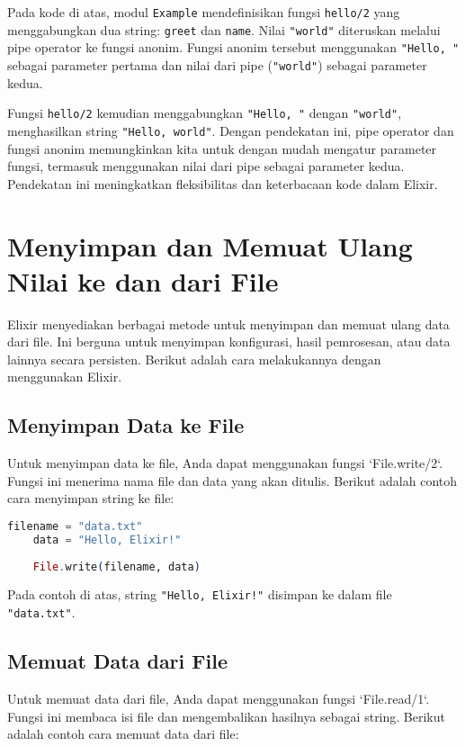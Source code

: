 Pada kode di atas, modul \texttt{Example} mendefinisikan fungsi \texttt{hello/2} yang menggabungkan dua string: \texttt{greet} dan \texttt{name}. Nilai \texttt{"world"} diteruskan melalui pipe operator ke fungsi anonim. Fungsi anonim tersebut menggunakan \texttt{"Hello, "} sebagai parameter pertama dan nilai dari pipe (\texttt{"world"}) sebagai parameter kedua. 

Fungsi \texttt{hello/2} kemudian menggabungkan \texttt{"Hello, "} dengan \texttt{"world"}, menghasilkan string \texttt{"Hello, world"}. Dengan pendekatan ini, pipe operator dan fungsi anonim memungkinkan kita untuk dengan mudah mengatur parameter fungsi, termasuk menggunakan nilai dari pipe sebagai parameter kedua. Pendekatan ini meningkatkan fleksibilitas dan keterbacaan kode dalam Elixir.

\section{Menyimpan dan Memuat Ulang Nilai ke dan dari File}

Elixir menyediakan berbagai metode untuk menyimpan dan memuat ulang data dari file. Ini berguna untuk menyimpan konfigurasi, hasil pemrosesan, atau data lainnya secara persisten. Berikut adalah cara melakukannya dengan menggunakan Elixir.

\subsection{Menyimpan Data ke File}

Untuk menyimpan data ke file, Anda dapat menggunakan fungsi `File.write/2`. Fungsi ini menerima nama file dan data yang akan ditulis. Berikut adalah contoh cara menyimpan string ke file:

\begin{lstlisting}[language=Elixir]
	filename = "data.txt"
	data = "Hello, Elixir!"
	
	File.write(filename, data)
\end{lstlisting}

Pada contoh di atas, string \texttt{"Hello, Elixir!"} disimpan ke dalam file \texttt{"data.txt"}.

\subsection{Memuat Data dari File}

Untuk memuat data dari file, Anda dapat menggunakan fungsi `File.read/1`. Fungsi ini membaca isi file dan mengembalikan hasilnya sebagai string. Berikut adalah contoh cara memuat data dari file:

